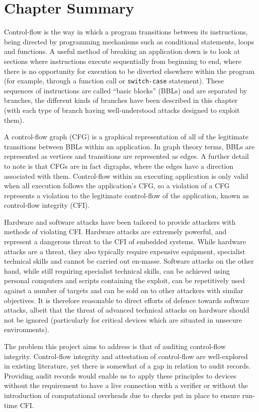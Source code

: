 \section{Chapter Summary}
Control-flow is the way in which a program transitions between its instructions, being directed by programming mechanisms such as conditional statements, loops and functions. A useful method of breaking an application down is to look at sections where instructions execute sequentially from beginning to end, where there is no opportunity for execution to be diverted elsewhere within the program (for example, through a function call or \verb|switch-case| statement). These sequences of instructions are called ``basic blocks'' (BBLs) and are separated by branches, the different kinds of branches have been described in this chapter (with each type of branch having well-understood attacks designed to exploit them).

A control-flow graph (CFG) is a graphical representation of all of the legitimate transitions between BBLs within an application. In graph theory terms, BBLs are represented as vertices and transitions are represented as edges. A further detail to note is that CFGs are in fact digraphs, where the edges have a direction associated with them. Control-flow within an executing application is only valid when all execution follows the application's CFG, so a violation of a CFG represents a violation to the legitimate control-flow of the application, known as control-flow integrity (CFI).

Hardware and software attacks have been tailored to provide attackers with methods of violating CFI. Hardware attacks are extremely powerful, and represent a dangerous threat to the CFI of embedded systems. While hardware attacks are a threat, they also typically require expensive equipment, specialist technical skills and cannot be carried out en-masse. Software attacks on the other hand, while still requiring specialist technical skills, can be achieved using personal computers and scripts containing the exploit, can be repetitively used against a number of targets and can be sold on to other attackers with similar objectives. It is therefore reasonable to direct efforts of defence towards software attacks, albeit that the threat of advanced technical attacks on hardware should not be ignored (particularly for critical devices which are situated in unsecure environments).

The problem this project aims to address is that of auditing control-flow integrity. Control-flow integrity and attestation of control-flow are well-explored in existing literature, yet there is somewhat of a gap in relation to audit records.  Providing audit records would enable us to apply these principles to devices without the requirement to have a live connection with a verifier or without the introduction of computational overheads due to checks put in place to ensure run-time CFI.